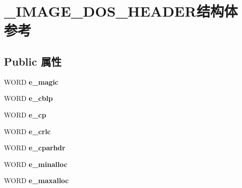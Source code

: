 \hypertarget{struct___i_m_a_g_e___d_o_s___h_e_a_d_e_r}{}\section{\+\_\+\+I\+M\+A\+G\+E\+\_\+\+D\+O\+S\+\_\+\+H\+E\+A\+D\+E\+R结构体 参考}
\label{struct___i_m_a_g_e___d_o_s___h_e_a_d_e_r}
\subsection*{Public 属性}
\begin{DoxyCompactItemize}
\item 
\mbox{\label{struct___i_m_a_g_e___d_o_s___h_e_a_d_e_r_a2395379130b4cc7d2d3e6982e6e3fc4c}} 
W\+O\+RD {\bfseries e\+\_\+magic}
\item 
\mbox{\label{struct___i_m_a_g_e___d_o_s___h_e_a_d_e_r_a1bd42856267579ce345e062eca7545c5}} 
W\+O\+RD {\bfseries e\+\_\+cblp}
\item 
\mbox{\label{struct___i_m_a_g_e___d_o_s___h_e_a_d_e_r_aaaa4b40f12deb3c4d6b23d106c3bfbce}} 
W\+O\+RD {\bfseries e\+\_\+cp}
\item 
\mbox{\label{struct___i_m_a_g_e___d_o_s___h_e_a_d_e_r_a9c7b1e78d0a6491d4fa41363b5aefecc}} 
W\+O\+RD {\bfseries e\+\_\+crlc}
\item 
\mbox{\label{struct___i_m_a_g_e___d_o_s___h_e_a_d_e_r_a880d14ac887440a6859c45a5b6c7db0c}} 
W\+O\+RD {\bfseries e\+\_\+cparhdr}
\item 
\mbox{\label{struct___i_m_a_g_e___d_o_s___h_e_a_d_e_r_a5a82bb159167fe8e23fbbc06ffb85b2c}} 
W\+O\+RD {\bfseries e\+\_\+minalloc}
\item 
\mbox{\label{struct___i_m_a_g_e___d_o_s___h_e_a_d_e_r_a65684758e3524a791a7a818322b57eea}} 
W\+O\+RD {\bfseries e\+\_\+maxalloc}
\item 
\mbox{\label{struct___i_m_a_g_e___d_o_s___h_e_a_d_e_r_ae8cba7f40bb926f2218808e7bc2a5965}} 

\end{DoxyCompactItemize}
